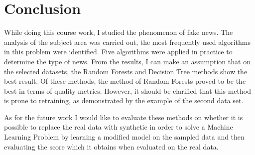 \newpage
\section{Conclusion}\label{sec:concl}

While doing this course work, I studied the phenomenon of fake news.
The analysis of the subject area was carried out, the most frequently used algorithms in this problem were identified.
Five algorithms were applied in practice to determine the type of news.
From the results, I can make an assumption that on the selected datasets, the Random Forests and Decision Tree methods show the best result.
Of these methods, the method of Random Forests proved to be the best in terms of quality metrics.
However, it should be clarified that this method is prone to retraining, as demonstrated by the example of the second data set.

As for the future work I would like to evaluate these methods on whether it is possible to replace the real data with synthetic in order to solve a Machine Learning Problem by learning a modified model on the sampled data and then evaluating the score which it obtains when evaluated on the real data.
